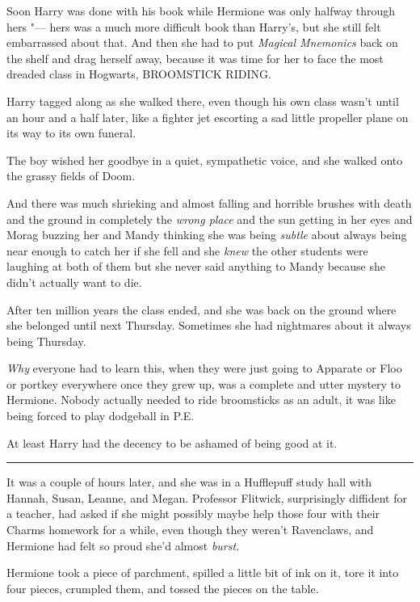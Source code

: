 Soon Harry was done with his book while Hermione was only halfway
through hers "--- hers was a much more difficult book than Harry's, but she
still felt embarrassed about that. And then she had to put \emph{Magical
Mnemonics} back on the shelf and drag herself away, because it was time
for her to face the most dreaded class in Hogwarts, BROOMSTICK RIDING.

Harry tagged along as she walked there, even though his own class wasn't
until an hour and a half later, like a fighter jet escorting a sad
little propeller plane on its way to its own funeral.

The boy wished her goodbye in a quiet, sympathetic voice, and she walked
onto the grassy fields of Doom.

And there was much shrieking and almost falling and horrible brushes
with death and the ground in completely the \emph{wrong place} and the
sun getting in her eyes and Morag buzzing her and Mandy thinking she was
being \emph{subtle} about always being near enough to catch her if she
fell and she \emph{knew} the other students were laughing at both of
them but she never said anything to Mandy because she didn't actually
want to die.

After ten million years the class ended, and she was back on the ground
where she belonged until next Thursday. Sometimes she had nightmares
about it always being Thursday.

\emph{Why} everyone had to learn this, when they were just going to
Apparate or Floo or portkey everywhere once they grew up, was a complete
and utter mystery to Hermione. Nobody actually needed to ride
broomsticks as an adult, it was like being forced to play dodgeball in
P.E.

At least Harry had the decency to be ashamed of being good at it.

\begin{center}\rule{3in}{0.4pt}\end{center}

It was a couple of hours later, and she was in a Hufflepuff study hall
with Hannah, Susan, Leanne, and Megan. Professor Flitwick, surprisingly
diffident for a teacher, had asked if she might possibly maybe help
those four with their Charms homework for a while, even though they
weren't Ravenclaws, and Hermione had felt so proud she'd almost
\emph{burst}.

Hermione took a piece of parchment, spilled a little bit of ink on it,
tore it into four pieces, crumpled them, and tossed the pieces on the
table.

